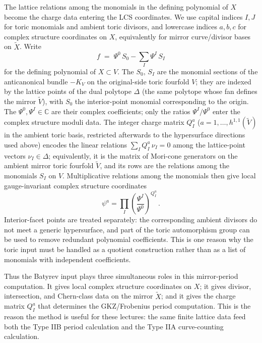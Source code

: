 The lattice relations among the monomials in the defining polynomial
of $X$ become the charge data entering the LCS coordinates.  We use
capital indices $I,J$ for toric monomials and ambient toric divisors,
and lowercase indices $a,b,c$ for complex structure coordinates on
$X$, equivalently for mirror curve/divisor bases on $\widetilde X$.
Write
\begin{equation}\label{eq:L2-defining-polynomial}
    f \;=\; \Psi^0\,S_0 - \sum_I \Psi^I\,S_I
\end{equation}
for the defining polynomial of $X\subset V$. The
$S_0,\,S_I$ are the monomial sections of the anticanonical bundle
$-K_{V}$ on the original-side toric fourfold $V$; they are indexed by the lattice
points of the dual polytope $\Delta$ (the same polytope whose fan
defines the mirror $\widetilde V$), with $S_0$ the interior-point
monomial corresponding to the origin. The
$\Psi^0,\Psi^I\in\mathbb{C}$ are their complex coefficients; only
the ratios $\Psi^I/\Psi^0$ enter the complex structure moduli data.
The integer charge matrix $Q^a_I$ ($a=1,\ldots,h^{1,1}(\widetilde
V)$ in the ambient toric basis, restricted afterwards to the
hypersurface directions used above) encodes the linear relations
$\sum_I Q^a_I\,\nu_I=0$ among the lattice-point vectors
$\nu_I\in\Delta$; equivalently, it is the matrix of Mori-cone
generators on the ambient mirror toric fourfold $\widetilde V$, and
its rows are the relations among the monomials $S_I$ on $V$.
Multiplicative relations among the monomials then give local
gauge-invariant complex structure coordinates
\begin{equation}
    \psi^a=\prod_I
      \left(\frac{\Psi^I}{\Psi^0}\right)^{Q^a_I}\, .
\end{equation}
Interior-facet points are treated separately: the corresponding
ambient divisors do not meet a generic hypersurface, and part of the
toric automorphism group can be used to remove redundant polynomial
coefficients.  This is one reason why the toric input must be handled
as a quotient construction rather than as a list of monomials with
independent coefficients.

Thus the Batyrev input plays three simultaneous roles in this
mirror-period computation.  It gives local complex structure
coordinates on $X$; it gives divisor, intersection, and Chern-class
data on the mirror $\widetilde X$; and it gives the charge matrix
$Q^a_I$ that determines the GKZ/Frobenius period computation.  This is the reason
the method is useful for these lectures: the same finite lattice data
feed both the Type IIB period calculation and the Type IIA
curve-counting calculation.

